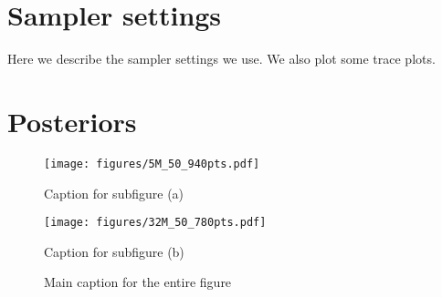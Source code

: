 \documentclass[twocolumn]{aastex631}
\begin{document}
\section{Sampler settings}\label{sec:appendix_sampler_settubgs}
Here we describe the sampler settings we use. 
We also plot some trace plots.


\section{Posteriors}



\begin{figure}[htb]
    \centering
    \begin{minipage}{0.45\columnwidth}
        \texttt{[image: figures/5M\_50\_940pts.pdf]}
        \caption{Caption for subfigure (a)}
    \end{minipage}\hfill
    \begin{minipage}{0.45\columnwidth}
        \texttt{[image: figures/32M\_50\_780pts.pdf]}
        \caption{Caption for subfigure (b)}
    \end{minipage}
    \caption{Main caption for the entire figure}
    \label{fig:main}
\end{figure}
\end{document}
